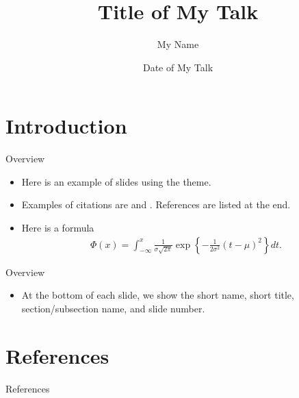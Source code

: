 \documentclass[10pt]{beamer}
\begin{document}
\title[Short title]{Title of My Talk}
\author[My Name]{My Name}
\date[Short Date]{Date of My Talk}

\begin{frame}[plain]
\maketitle
\vspace{-1em}
\begin{center}
\vspace{1em}
\end{center}
\end{frame}

\section{Introduction}
\begin{frame}{Overview}
\begin{itemize}
\item Here is an example of slides using the theme.
\item Examples of citations are \citep{cran} and \citet{HastieTibshiraniFriedman2009}. References are listed at the end.
\item Here is a formula
%
\begin{align*}
\Phi(x) = \int_{-\infty}^x \frac{1}{\sigma \sqrt{2 \pi}}
\exp\left\{ -\frac{1}{2 \sigma^2} (t - \mu)^2  \right\} dt.
\end{align*}

\end{itemize}
\end{frame}

\begin{frame}{Overview}
\begin{itemize}
\item At the bottom of each slide, we show the short name, short title, section/subsection name, and slide number.
\end{itemize}
\end{frame}


\section{References}
\begin{frame}{References}
\small


\end{frame}
\end{document}
